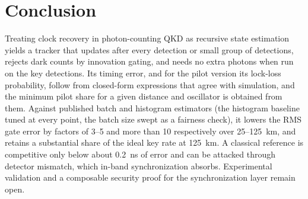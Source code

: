 \documentclass[journal]{IEEEtran}
\theoremstyle{plain}
\begin{document}
\section{Conclusion}
Treating clock recovery in photon-counting QKD as recursive state estimation yields a tracker that updates after every detection or small group of detections, rejects dark counts by innovation gating, and needs no extra photons when run on the key detections. Its timing error, and for the pilot version its lock-loss probability, follow from closed-form expressions that agree with simulation, and the minimum pilot share for a given distance and oscillator is obtained from them. Against published batch and histogram estimators (the histogram baseline tuned at every point, the batch size swept as a fairness check), it lowers the RMS gate error by factors of 3--5 and more than 10 respectively over 25--125~km, and retains a substantial share of the ideal key rate at 125~km. A classical reference is competitive only below about 0.2~ns of error and can be attacked through detector mismatch, which in-band synchronization absorbs. Experimental validation and a composable security proof for the synchronization layer remain open.



\end{document}

